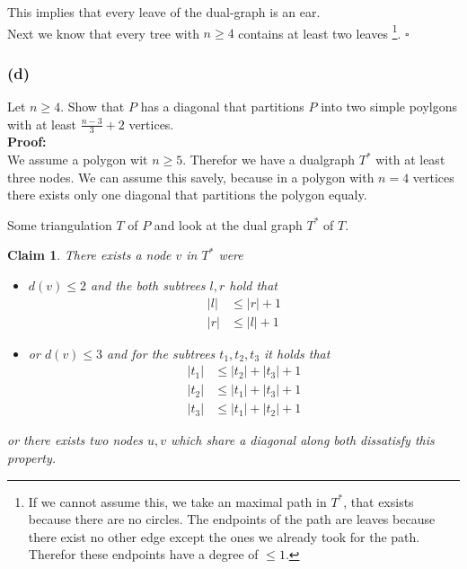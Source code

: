 \documentclass[11pt,a4paper,ngerman]{article}
\newtheorem{lemma}{\bfseries Claim}
\begin{document}
This implies that every leave of the dual-graph is an ear.\\

Next we know that every tree with $n\geq 4$ contains at least two leaves
\footnote{If we cannot assume this, we take an maximal path in $T^*$, that exsists because there are no circles.
The endpoints of the path are leaves because there exist no other edge except the ones we already took for the path.
Therefor these endpoints have a degree of $\leq 1$.}.
\mbox{} \hfill $\square$

\subsubsection*{(d)}

Let $n \geq 4$. Show that $P$ has a diagonal that partitions $P$ into two
simple poylgons with at least $\frac{n-3}{3} + 2$ vertices.\\

\textbf{Proof:}\\

We assume a polygon wit $n\geq 5$. Therefor we have a dualgraph $T^*$ with at least
three nodes. We can assume this savely, because in a polygon with $n = 4$ vertices
there exists only one diagonal that partitions the polygon equaly.

Some triangulation $T$ of $P$ and look at the dual graph $T^*$ of $T$.

\begin{lemma}\label{alge:ueb3:centerpoint}
There exists a node $v$ in $T^*$ were
\begin{itemize}
    \item $d(v) \leq 2$ and the both subtrees $l, r$ hold that
        \begin{equation}\begin{split}
            |l| &\leq |r| + 1\\
            |r| &\leq |l| + 1
        \end{split}\end{equation}
    \item or $d(v) \leq 3$ and for the subtrees $t_1, t_2, t_3$ it holds that
        \begin{equation}\begin{split}
            |t_1| &\leq |t_2| + |t_3| + 1\\
            |t_2| &\leq |t_1| + |t_3| + 1\\
            |t_3| &\leq |t_1| + |t_2| + 1
        \end{split}\end{equation}
\end{itemize}
or there exists two nodes $u,v$ which share a diagonal along both dissatisfy this property.
\end{lemma}
\end{document}
